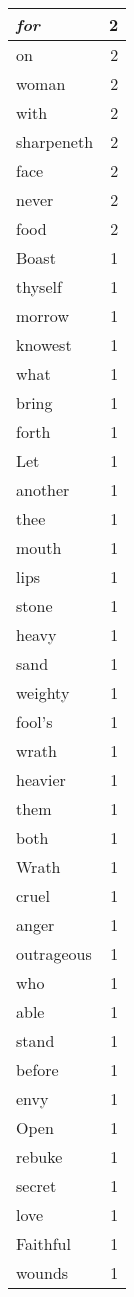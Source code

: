 \begin{center}
\begin{longtable}{l|r}
\emph{for} & 2\\ \hline 
on & 2\\ \hline 
woman & 2\\ \hline 
with & 2\\ \hline 
sharpeneth & 2\\ \hline 
face & 2\\ \hline 
never & 2\\ \hline 
food & 2\\ \hline 
Boast & 1\\ \hline 
thyself & 1\\ \hline 
morrow & 1\\ \hline 
knowest & 1\\ \hline 
what & 1\\ \hline 
bring & 1\\ \hline 
forth & 1\\ \hline 
Let & 1\\ \hline 
another & 1\\ \hline 
thee & 1\\ \hline 
mouth & 1\\ \hline 
lips & 1\\ \hline 
stone & 1\\ \hline 
heavy & 1\\ \hline 
sand & 1\\ \hline 
weighty & 1\\ \hline 
fool's & 1\\ \hline 
wrath & 1\\ \hline 
heavier & 1\\ \hline 
them & 1\\ \hline 
both & 1\\ \hline 
Wrath & 1\\ \hline 
cruel & 1\\ \hline 
anger & 1\\ \hline 
outrageous & 1\\ \hline 
who & 1\\ \hline 
able & 1\\ \hline 
stand & 1\\ \hline 
before & 1\\ \hline 
envy & 1\\ \hline 
Open & 1\\ \hline 
rebuke & 1\\ \hline 
secret & 1\\ \hline 
love & 1\\ \hline 
Faithful & 1\\ \hline 
wounds & 1\\ \hline 

\end{longtable}
\end{center}
